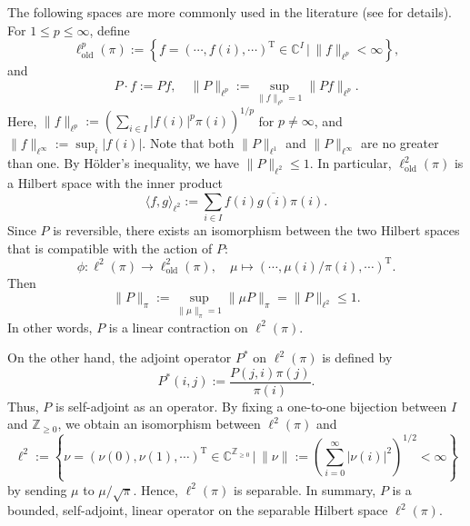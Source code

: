 \documentclass[a4]{amsart}
\newcommand{\BC}{{\mathbb {C}}}
\newcommand{\T}{\mathrm{T}}
\theoremstyle{remark} \newtheorem{remark}[theorem]{Remark}
\begin{document}
The following spaces are more commonly used in the literature (see \cite{gallegos-herrada2024Equivalences} for details). For $1 \leq p \leq \infty$, define
\[
\ell^p_{\mathrm{old}}(\pi) := \left\{f = (\cdots, f(i), \cdots)^\T \in \BC^{I} \,\bigg|\, \|f\|_{\ell^p} < \infty\right\},
\]
and
\[
P \cdot f := Pf, \quad \|P\|_{\ell^p} := \sup_{\|f\|_{\ell^p} = 1} \|Pf\|_{\ell^p}.
\]
Here, $\|f\|_{\ell^p} := \left(\sum_{i \in I} |f(i)|^p \pi(i)\right)^{1/p}$ for $p \neq \infty$, and $\|f\|_{\ell^\infty} := \sup_{i} |f(i)|$. Note that both $\|P\|_{\ell^1}$ and $\|P\|_{\ell^\infty}$ are no greater than one. By H\"older's inequality, we have $\|P\|_{\ell^2} \leq 1$. 
In particular, $\ell^2_{\mathrm{old}}(\pi)$ is a Hilbert space with the inner product
\[
\langle f, g \rangle_{\ell^2} := \sum_{i \in I} f(i) \overline{g(i)} \pi(i).
\]
Since $P$ is reversible, there exists an isomorphism between the two Hilbert spaces that is compatible with the action of $P$:
\[
\phi: \ell^2(\pi) \to \ell^2_{\mathrm{old}}(\pi), \quad \mu \mapsto (\cdots, \mu(i)/\pi(i), \cdots)^\T.
\]
Then
\[
\|P\|_{\pi} := \sup_{\|\mu\|_{\pi} = 1} \|\mu P\|_{\pi} = \|P\|_{\ell^2} \leq 1.
\]
In other words, $P$ is a linear contraction on $\ell^2(\pi)$.

On the other hand, the adjoint operator $P^\ast$ on $\ell^2(\pi)$ is defined by
\[
P^\ast(i, j) := \frac{P(j,i)\pi(j)}{\pi(i)}.
\]
Thus, $P$ is self-adjoint as an operator. 
By fixing a one-to-one bijection between $I$ and $\mathbb{Z}_{\geq 0}$, we obtain an isomorphism between $\ell^2(\pi)$ and
\[
\ell^2 := \left\{\nu = (\nu(0), \nu(1), \cdots)^\T \in \BC^{\mathbb{Z}_{\geq 0}} \,\bigg|\, \|\nu\| := \left(\sum_{i=0}^{\infty} |\nu(i)|^2\right)^{1/2} < \infty\right\}
\]
by sending $\mu$ to $\mu/\sqrt{\pi}$. Hence, $\ell^2(\pi)$ is separable. In summary, $P$ is a bounded, self-adjoint, linear operator on the separable Hilbert space $\ell^2(\pi)$.
\end{document}
